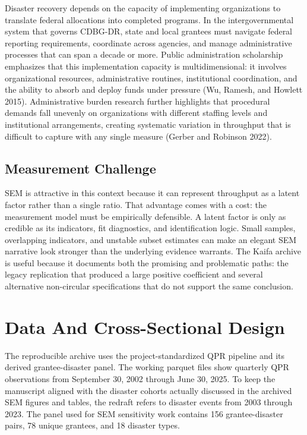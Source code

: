 \documentclass[
  letterpaper,
]{article}
\begin{document}
Disaster recovery depends on the capacity of implementing organizations
to translate federal allocations into completed programs. In the
intergovernmental system that governs CDBG-DR, state and local grantees
must navigate federal reporting requirements, coordinate across
agencies, and manage administrative processes that can span a decade or
more. Public administration scholarship emphasizes that this
implementation capacity is multidimensional: it involves organizational
resources, administrative routines, institutional coordination, and the
ability to absorb and deploy funds under pressure (Wu, Ramesh, and
Howlett 2015). Administrative burden research further highlights that
procedural demands fall unevenly on organizations with different
staffing levels and institutional arrangements, creating systematic
variation in throughput that is difficult to capture with any single
measure (Gerber and Robinson 2022).

\subsection{Measurement Challenge}\label{measurement-challenge}

SEM is attractive in this context because it can represent throughput as
a latent factor rather than a single ratio. That advantage comes with a
cost: the measurement model must be empirically defensible. A latent
factor is only as credible as its indicators, fit diagnostics, and
identification logic. Small samples, overlapping indicators, and
unstable subset estimates can make an elegant SEM narrative look
stronger than the underlying evidence warrants. The Kaifa archive is
useful because it documents both the promising and problematic paths:
the legacy replication that produced a large positive coefficient and
several alternative non-circular specifications that do not support the
same conclusion.

\section{Data And Cross-Sectional
Design}\label{data-and-cross-sectional-design}

The reproducible archive uses the project-standardized QPR pipeline and
its derived grantee-disaster panel. The working parquet files show
quarterly QPR observations from September 30, 2002 through June 30,
2025. To keep the manuscript aligned with the disaster cohorts actually
discussed in the archived SEM figures and tables, the redraft refers to
disaster events from 2003 through 2023. The panel used for SEM
sensitivity work contains 156 grantee-disaster pairs, 78 unique
grantees, and 18 disaster types.
\end{document}
